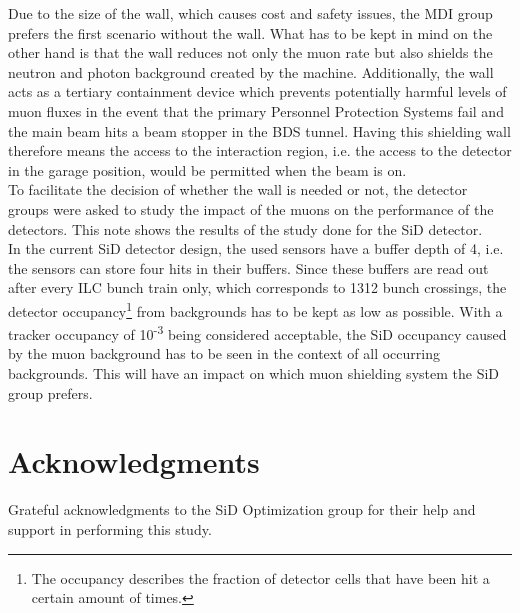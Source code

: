 \documentclass[12pt]{article}
\begin{document}
Due to the size of the wall, which causes cost and safety issues, the MDI group prefers the first scenario without the wall.
What has to be kept in mind on the other hand is that the wall reduces not only the muon rate but also shields the neutron and photon background created by the machine.
Additionally, the wall acts as a tertiary containment device which prevents potentially harmful levels of muon fluxes in the event that the primary Personnel Protection Systems fail and the main beam hits a beam stopper in the BDS tunnel.
Having this shielding wall therefore means the access to the interaction region, i.e. the access to the detector in the garage position, would be permitted when the beam is on.
\\
To facilitate the decision of whether the wall is needed or not, the detector groups were asked to study the impact of the muons on the performance of the detectors.
This note shows the results of the study done for the SiD detector.\\
In the current SiD detector design, the used sensors have a buffer depth of 4, i.e. the sensors can store four hits in their buffers.
Since these buffers are read out after every ILC bunch train only, which corresponds to 1312 bunch crossings, the detector occupancy\footnote{The occupancy describes the fraction of detector cells that have been hit a certain amount of times.} from backgrounds has to be kept as low as possible.
With a tracker occupancy of 10\textsuperscript{-3} being considered acceptable, the SiD occupancy caused by the muon background has to be seen in the context of all occurring backgrounds.
This will have an impact on which muon shielding system the SiD group prefers.







\section*{Acknowledgments}
Grateful acknowledgments to the SiD Optimization group for their help and support in performing this study.

%




\end{document}
